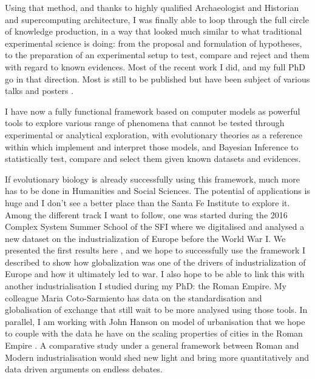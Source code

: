 \documentclass[10pt]{article}
\begin{document}
Using that method, and thanks to highly qualified Archaeologist and Historian and supercomputing architecture,  I was finally able to loop through the full circle of knowledge production, in a way that looked much similar to what traditional experimental science is doing: from the proposal and formulation of hypotheses, to the preparation of an experimental setup to test, compare and reject and them with regard to known evidences. Most of the recent work I did, and my full PhD go in that direction. Most is still to be published but have been subject of various talks and posters \cite{coto2016exploringamphorabetica,carrignon2018abmtrac,romanowska2018jerash,carrignon2017impactofdifferentsociallearningmechanismsontheemergenceofawalrasianequilibrium,carrignon2018hpcmodel,carrignon2018}. 

I have now a fully functional framework based on computer models as powerful tools to explore various range of phenomena that cannot be tested through experimental or analytical exploration, with evolutionary theories as a reference within which implement and interpret those models, and Bayesian Inference to statistically test, compare and select them given known datasets and evidences.

If evolutionary biology is already successfully using this framework, much more has to be done in Humanities and Social Sciences. The potential of applications is huge and I don't see a better place than the Santa Fe Institute to explore it. Among the different track I want to follow, one was started during the 2016 Complex System Summer School of the SFI where we digitalised and analysed a new dataset on the industrialization of Europe before the World War I. We presented the first results here \cite{carrignon2016patternsinglobalization}, and we hope to successfully use the framework I described to show how globalization was one of the drivers of industrialization of Europe and how it ultimately led to war. I also hope to be able to link this with another industrialisation I studied during my PhD: the Roman Empire. My colleague Maria Coto-Sarmiento has data on the standardisation and globalisation of exchange\cite{COTOSARMIENTO2018117} that still wait to be more analysed using those tools. In parallel, I am working with John Hanson on model of urbanisation that we hope to couple with the data he have on the scaling properties of cities in the Roman Empire \cite{Hanson20170367}. A comparative study under a general framework between Roman and Modern industrialisation would shed new light and bring more quantitatively and data driven arguments on endless debates.
\end{document}
